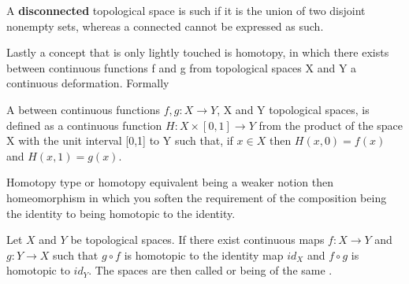 \documentclass[../../main.tex]{subfiles}
\begin{document}
    A \textbf{disconnected} topological space is such if it is the union of two disjoint nonempty sets, whereas a connected cannot be expressed as such. 

    Lastly a concept that is only lightly touched is homotopy, in which there exists between continuous functions f and g from topological spaces X and Y a continuous deformation. Formally

    \begin{definition}
        A  between continuous functions $f,g: X\to Y$, X and Y topological spaces, is defined as a continuous function  $H : X \times [0,1] \to Y$ from the product of the space X with the unit interval [0,1] to Y such that, if $x \in X$ then $H(x,0) = f(x)$ and $H(x,1) = g(x)$.
    \end{definition}

    Homotopy type or homotopy equivalent being a weaker notion then homeomorphism in which you soften the requirement of the composition being the identity to being homotopic to the identity. 

    \begin{definition}
        Let $X$ and $Y$ be topological spaces. If there exist continuous maps $f : X \to Y$ and $g : Y \to X$ such that $g \circ f$ is homotopic to the identity map $id_X$ and $f \circ g$ is homotopic to $id_Y$. The spaces are then called  or being of the same .
    \end{definition}
\end{document}
